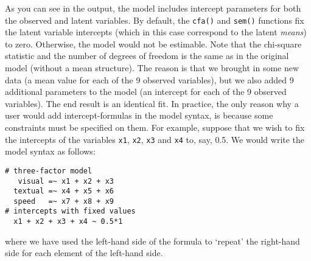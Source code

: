 As you can see in the output, the model includes intercept parameters
for both the observed and latent variables. By default, the
\texttt{cfa()} and \texttt{sem()} functions fix the latent variable
intercepts (which in this case correspond to the latent \emph{means}) to
zero. Otherwise, the model would not be estimable. Note that the
chi-square statistic and the number of degrees of freedom is the same as
in the original model (without a mean structure). The reason is that we
brought in some new data (a mean value for each of the 9 observed
variables), but we also added 9 additional parameters to the model (an
intercept for each of the 9 observed variables). The end result is an
identical fit. In practice, the only reason why a user would add
intercept-formulas in the model syntax, is because some constraints must
be specified on them. For example, suppose that we wish to fix the
intercepts of the variables \texttt{x1}, \texttt{x2}, \texttt{x3} and
\texttt{x4} to, say, 0.5. We would write the model syntax as follows:

\begin{verbatim}
# three-factor model
   visual =~ x1 + x2 + x3
  textual =~ x4 + x5 + x6
  speed   =~ x7 + x8 + x9
# intercepts with fixed values
  x1 + x2 + x3 + x4 ~ 0.5*1
\end{verbatim}

where we have used the left-hand side of the formula to `repeat' the
right-hand side for each element of the left-hand side.
